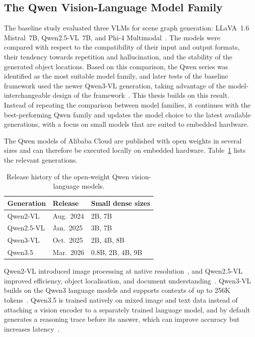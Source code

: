 {{{}

\subsection{The Qwen Vision-Language Model Family}
\label{subsec:qwen}

{\small

The baseline study evaluated three VLMs for scene graph generation: LLaVA~1.6 Mistral~7B, Qwen2.5-VL~7B, and Phi-4 Multimodal~\cite{previous_rsg_thesis}. The models were compared with respect to the compatibility of their input and output formats, their tendency towards repetition and hallucination, and the stability of the generated object locations. Based on this comparison, the Qwen series was identified as the most suitable model family, and later tests of the baseline framework used the newer Qwen3-VL generation, taking advantage of the model-interchangeable design of the framework~\cite{previous_rsg_thesis}. This thesis builds on this result. Instead of repeating the comparison between model families, it continues with the best-performing Qwen family and updates the model choice to the latest available generations, with a focus on small models that are suited to embedded hardware.

The Qwen models of Alibaba Cloud are published with open weights in several sizes and can therefore be executed locally on embedded hardware. Table~\ref{tab:qwen_history} lists the relevant generations.

\begin{table}[htbp]
\centering
\small
\caption{Release history of the open-weight Qwen vision-language models.}
\label{tab:qwen_history}
\begin{tabular}{l l l}
\toprule
Generation & Release & Small dense sizes \\
\midrule
Qwen2-VL   & Aug.\ 2024 & 2B, 7B \\
Qwen2.5-VL & Jan.\ 2025 & 3B, 7B \\
Qwen3-VL   & Oct.\ 2025 & 2B, 4B, 8B \\
Qwen3.5    & Mar.\ 2026 & 0.8B, 2B, 4B, 9B \\
\bottomrule
\end{tabular}
\end{table}

Qwen2-VL introduced image processing at native resolution~\cite{wang2024qwen2vl}, and Qwen2.5-VL improved efficiency, object localisation, and document understanding~\cite{bai2025qwen25vl}. Qwen3-VL builds on the Qwen3 language models and supports contexts of up to 256K tokens~\cite{bai2025qwen3vl}. Qwen3.5 is trained natively on mixed image and text data instead of attaching a vision encoder to a separately trained language model, and by default generates a reasoning trace before its answer, which can improve accuracy but increases latency~\cite{qwen2026qwen35}.

}}}
